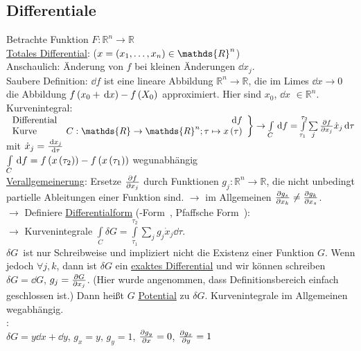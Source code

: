 \subsection{Differentiale}
Betrachte Funktion $F: \mathds{R}^n \to \mathds{R}$\\
\uline{Totales Differential}:  ($x=\norBra{x_1,\dots,x_n}\in \mathds{R}^n$)\\
Anschaulich: Änderung von $f$ bei kleinen Änderungen $\dd{x_j}$.\\
Saubere Definition: $\dd{f}$ ist eine lineare Abbildung $\mathds{R}^n \to \mathds{R}$, die im Limes $\dd{x}\to 0$ die Abbildung $f\left( x_0+\,\text d{x} \right)-f\left( X_0 \right)$ approximiert. Hier sind $x_0$, $\dd{x}$ $\in \mathds{R}^n$.\\
Kurvenintegral:\\
$\left.\begin{array}{l r}\text{Differential}&\dd{f} \\ \text{Kurve}&C: \mathds{R} \to \mathds{R}^n; \tau \mapsto x\norBra{\tau}\end{array} \right\} \to \int\limits_C \dd{f} = \int\limits_{\tau_1}^{\tau_2} \sum\limits_j \ppv{f}{x_j}\dot{x}_j \dd{\tau}$\\
mit $\dot{x}_j = \frac{\,\text d{x_j}}{\,\text d{\tau}}$\\
$\int\limits_C \,\text d{f} = f\left( x\left( \tau_2 \right) \right)-f\left( x\left( \tau_1 \right) \right)$ wegunabhängig\\
\uline{Verallgemeinerung}: Ersetze $\frac{\partial f}{\partial x_j}$ durch Funktionen $g_j: \mathds{R}^n \to \mathds{R}$, die nicht unbedingt partielle Ableitungen einer Funktion sind. $\rightarrow$ im Allgemeinen $\frac{\partial g_s}{\partial x_k} \neq \frac{\partial g_k}{\partial x_s}$.\\
$\rightarrow$ Definiere \uline{Differentialform} (-Form\grqq\ , \glqq Pfaffsche Form\grqq\ ):\\
 $\rightarrow$ Kurvenintegrale $\int\limits_C\delta G = \int\limits_{\tau_1}^{\tau_2} \sum\limits_j g_j \dot{x}_j \dd{\tau}$.\\
\glqq$\delta G$\grqq\ ist nur Schreibweise und impliziert nicht die Existenz einer Funktion $G$. Wenn jedoch  $\forall j,k$, dann ist $\delta G$ ein \uline{exaktes Differential} und wir können schreiben$\delta G = \dd{G}$, $g_j = \frac{\partial G}{\partial x_j}$. (Hier wurde angenommen, dass Definitionsbereich einfach geschlossen ist.) Dann heißt $G$ \uline{Potential} zu $\delta G$. Kurvenintegrale im Allgemeinen wegabhängig.\\
:\\
$\delta G = y \dd{x} + \dd{y}$, $g_x = y$, $g_y = 1$, $\frac{\partial g_y}{\partial x} = 0$, $\frac{\partial g_x}{\partial y} = 1$
\begin{figure}[H]
  \centering
  
\end{figure}

